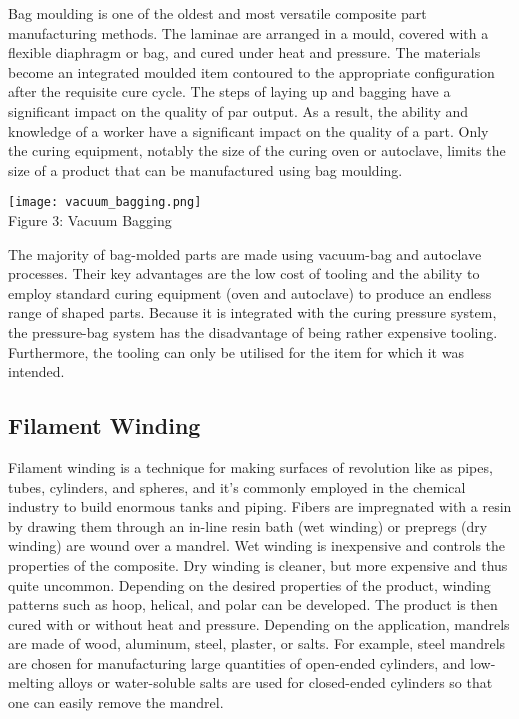 \documentclass{article}
\begin{document}
\begin{multicols}{2}
Bag moulding is one of the oldest and most versatile composite part manufacturing methods. The laminae are arranged in a mould, covered with a flexible diaphragm or bag, and cured under heat and pressure. The materials become an integrated moulded item contoured to the appropriate configuration after the requisite cure cycle. The steps of laying up and bagging have a significant impact on the quality of par output. As a result, the ability and knowledge of a worker have a significant impact on the quality of a part. Only the curing equipment, notably the size of the curing oven or autoclave, limits the size of a product that can be manufactured using bag moulding.

\begin{center}
\texttt{[image: vacuum\_bagging.png]}\\

{\small Figure 3: Vacuum Bagging}
\end{center}

The majority of bag-molded parts are made using vacuum-bag and autoclave processes. Their key advantages are the low cost of tooling and the ability to employ standard curing equipment (oven and autoclave) to produce an endless range of shaped parts. Because it is integrated with the curing pressure system, the pressure-bag system has the disadvantage of being rather expensive tooling. Furthermore, the tooling can only be utilised for the item for which it was intended.

\subsection{Filament Winding}

Filament winding is a technique for making surfaces of revolution like as pipes, tubes, cylinders, and spheres, and it's commonly employed in the chemical industry to build enormous tanks and piping. Fibers are impregnated with a resin by drawing them through an in-line resin bath (wet winding)  or prepregs (dry winding) are wound over a mandrel. Wet winding is inexpensive and controls the properties of the composite. Dry winding is cleaner, but more expensive and thus quite uncommon. Depending on the desired properties of the product, winding patterns such as hoop, helical, and polar can be developed. The product is then cured with or without heat and pressure. Depending on the application, mandrels are made of wood, aluminum, steel, plaster, or salts. For example, steel mandrels are chosen for manufacturing large quantities of open-ended cylinders, and low-melting alloys or water-soluble salts are used for closed-ended cylinders so that one can easily remove the mandrel.


\end{multicols}
\end{document}
